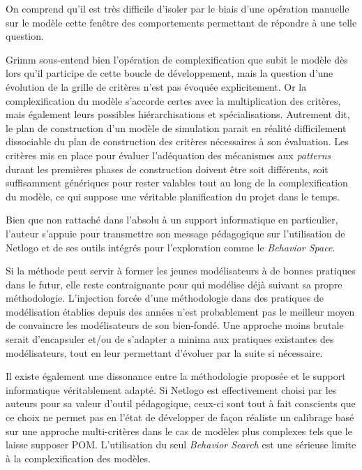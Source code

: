 On comprend qu'il est très difficile d'isoler par le biais d'une opération manuelle sur le modèle cette fenêtre des comportements permettant de répondre à une telle question. 

Grimm sous-entend bien l'opération de complexification que subit le modèle dès lors qu'il participe de cette boucle de développement, mais la question d'une évolution de la grille de critères n'est pas évoquée explicitement. Or la complexification du modèle s'accorde certes avec la multiplication des critères, mais également leurs possibles hiérarchisations et spécialisations. Autrement dit, le plan de construction d'un modèle de simulation parait en réalité difficilement dissociable du plan de construction des critères nécessaires à son évaluation. Les critères mis en place pour évaluer l'adéquation des mécanismes aux \textit{patterns} durant les premières phases de construction doivent être soit différents, soit suffisamment génériques pour rester valables tout au long de la complexification du modèle, ce qui suppose une véritable planification du projet dans le temps.

Bien que non rattaché dans l'absolu à un support informatique en particulier, l'auteur s'appuie pour transmettre son message pédagogique sur l'utilisation de Netlogo et de ses outils intégrés pour l'exploration comme le \textit{Behavior Space}.

Si la méthode peut servir à former les jeunes modélisateurs à de bonnes pratiques dans le futur, elle reste contraignante pour qui modélise déjà suivant sa propre méthodologie. L'injection forcée d'une méthodologie dans des pratiques de modélisation établies depuis des années n'est probablement pas le meilleur moyen de convaincre les modélisateurs de son bien-fondé. Une approche moins brutale serait d'encapsuler et/ou de s'adapter a minima aux pratiques existantes des modélisateurs, tout en leur permettant d'évoluer par la suite si nécessaire.

Il existe également une dissonance entre la méthodologie proposée et le support informatique véritablement adapté. Si Netlogo est effectivement choisi par les auteurs pour sa valeur d'outil pédagogique, ceux-ci sont tout à fait conscients \autocite[313-316]{Railsback2012}  que ce choix ne permet pas en l'état de développer de façon réaliste un calibrage basé sur une approche multi-critères dans le cas de modèles plus complexes tels que le laisse supposer POM. L'utilisation du seul \textit{Behavior Search} est une sérieuse limite à la complexification des modèles. %

